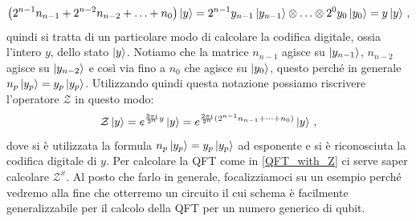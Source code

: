 \begin{equation*}
    \left( 2^{n-1} n_{n-1} + 2^{n-2} n_{n-2} + \ldots + n_0 \right) \ket y = 2^{n-1} y_{n-1} \ket{y_{n-1}} \otimes \ldots \otimes 2^0 y_0 \ket{y_0} = y\ket y \, ,
\end{equation*}
quindi si tratta di un particolare modo di calcolare la codifica digitale, ossia l'intero $y$, dello stato $\ket{y}$. Notiamo che la matrice $n_{n-1}$ agisce su $\ket{y_{n-1}}$, $n_{n-2}$ agisce su $\ket{y_{n-2}}$ e così via fino a $n_0$ che agisce su $\ket{y_0}$,   questo perché in generale $n_p \ket{y_p} = y_p \ket{y_p}$. Utilizzando quindi questa notazione possiamo riscrivere l'operatore $\mathcal{Z}$ in questo modo: 
\begin{equation*}
    \mathcal{Z} \ket y = e^{\frac{2 \pi i}{2^n} y} \ket y = e^{\frac{2\pi i}{2^n} (2^{n-1}n_{n-1}+\dots+n_0)} \ket y \, ,
\end{equation*}
dove si è utilizzata la formula $n_p \ket{y_p} = y_p \ket{y_p}$ ad esponente e si è riconosciuta la codifica digitale di $y$. Per calcolare la QFT come in \eqref{QFT_with_Z} ci serve saper calcolare $\mathcal{Z}^x$. Al posto che farlo in generale, focalizziamoci su un esempio perché vedremo alla fine che otterremo un circuito il cui schema è facilmente generalizzabile per il calcolo della QFT per un numero generico di qubit.


